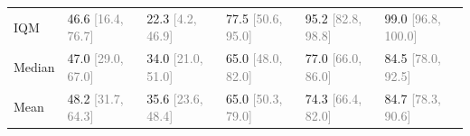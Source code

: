 \begin{tabular}{llllll}
IQM & 46.6 \textcolor{gray}{[16.4, 76.7]} & 22.3 \textcolor{gray}{[4.2, 46.9]} & 77.5 \textcolor{gray}{[50.6, 95.0]} & 95.2 \textcolor{gray}{[82.8, 98.8]} & 99.0 \textcolor{gray}{[96.8, 100.0]} \\
Median & 47.0 \textcolor{gray}{[29.0, 67.0]} & 34.0 \textcolor{gray}{[21.0, 51.0]} & 65.0 \textcolor{gray}{[48.0, 82.0]} & 77.0 \textcolor{gray}{[66.0, 86.0]} & 84.5 \textcolor{gray}{[78.0, 92.5]} \\
Mean & 48.2 \textcolor{gray}{[31.7, 64.3]} & 35.6 \textcolor{gray}{[23.6, 48.4]} & 65.0 \textcolor{gray}{[50.3, 79.0]} & 74.3 \textcolor{gray}{[66.4, 82.0]} & 84.7 \textcolor{gray}{[78.3, 90.6]} \\
\bottomrule
\end{tabular}

